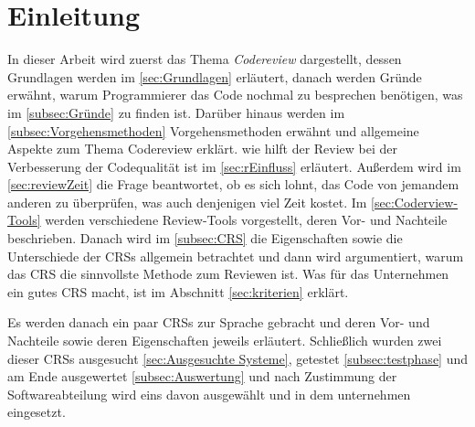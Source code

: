 \newpage
\listoftodos

\section{Einleitung}
\label{sec:Einleitung}

In dieser Arbeit wird zuerst das Thema \emph{Codereview} dargestellt, dessen Grundlagen werden im \cref{sec:Grundlagen} erläutert, danach werden Gründe erwähnt, warum Programmierer das Code nochmal zu besprechen benötigen, was im \cref{subsec:Gründe} zu finden ist. Darüber hinaus werden im \cref{subsec:Vorgehensmethoden} Vorgehensmethoden erwähnt und allgemeine Aspekte zum Thema Codereview erklärt. wie hilft der Review bei der Verbesserung der Codequalität ist im \cref{sec:rEinfluss} erläutert. Außerdem wird im \cref{sec:reviewZeit} die Frage beantwortet, ob es sich lohnt, das Code von jemandem anderen zu überprüfen, was auch denjenigen viel Zeit kostet.
Im \cref{sec:Coderview-Tools} werden verschiedene Review-Tools vorgestellt, deren Vor- und Nachteile beschrieben. Danach wird im \cref{subsec:CRS} die Eigenschaften sowie die Unterschiede der \acp{CRS} allgemein betrachtet und dann wird argumentiert, warum das \ac{CRS} die sinnvollste Methode zum Reviewen ist. Was für das Unternehmen ein gutes \ac{CRS} macht, ist im Abschnitt \ref{sec:kriterien} erklärt.

Es werden danach ein paar \acp{CRS} zur Sprache gebracht und deren Vor- und Nachteile sowie deren Eigenschaften jeweils erläutert. Schließlich wurden zwei dieser \acp{CRS} ausgesucht \cref{sec:Ausgesuchte Systeme}, getestet \cref{subsec:testphase} und am Ende ausgewertet \cref{subsec:Auswertung} und nach Zustimmung der Softwareabteilung wird eins davon ausgewählt und in dem unternehmen eingesetzt.
